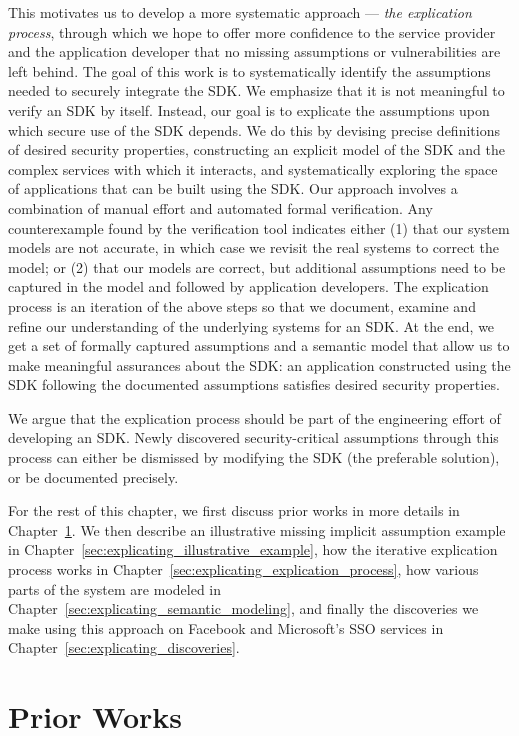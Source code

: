 This motivates us to develop a more systematic approach --- \emph{the explication process}, through which we hope to offer more confidence to the service provider and the application developer that no missing assumptions or vulnerabilities are left behind.  The goal of this work is to systematically identify the assumptions needed to securely integrate the SDK.  We emphasize that it is not meaningful to verify an SDK by itself.  Instead, our goal is to explicate the assumptions upon which secure use of the SDK depends.  We do this by devising precise definitions of desired security properties, constructing an explicit model of the SDK and the complex services with which it interacts, and systematically exploring the space of applications that can be built using the SDK.  Our approach involves a combination of manual effort and automated formal verification.  Any counterexample found by the verification tool indicates either (1) that our system models are not accurate, in which case we revisit the real systems to correct the model; or (2) that our models are correct, but additional assumptions need to be captured in the model and followed by application developers.  The explication process is an iteration of the above steps so that we document, examine and refine our understanding of the underlying systems for an SDK.  At the end, we get a set of formally captured assumptions and a semantic model that allow us to make meaningful assurances about the SDK: an application constructed using the SDK following the documented assumptions satisfies desired security properties.

We argue that the explication process should be part of the engineering effort of developing an SDK.  Newly discovered security-critical assumptions through this process can either be dismissed by modifying the SDK (the preferable solution), or be documented precisely.

For the rest of this chapter, we first discuss prior works in more details in Chapter~\ref{sec:explicating_prior_works}.  We then describe an illustrative missing implicit assumption example in Chapter~\ref{sec:explicating_illustrative_example}, how the iterative explication process works in Chapter~\ref{sec:explicating_explication_process}, how various parts of the system are modeled in Chapter~\ref{sec:explicating_semantic_modeling}, and finally the discoveries we make using this approach on Facebook and Microsoft's SSO services in Chapter~\ref{sec:explicating_discoveries}.

\section{Prior Works}
\label{sec:explicating_prior_works}

